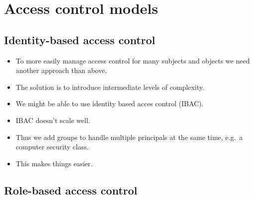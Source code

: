 \mode*




\section{Access control models}

\subsection{Identity-based access control}

\begin{frame}
  \begin{itemize}
    \item To more easily manage access control for many subjects and objects we 
      need another approach than above.

    \item The solution is to introduce intermediate levels of complexity.

  \end{itemize}
\end{frame}

\begin{frame}
  \begin{itemize}
    \item We might be able to use identity based acces control (IBAC).
    \item IBAC doesn't scale well.

    \item Thus we add groups to handle multiple principals at the same time, 
      e.g.\ a computer security class.

    \item This makes things easier.

  \end{itemize}
\end{frame}

\subsection{Role-based access control}

